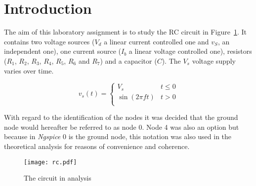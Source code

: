 \section{Introduction}
\label{sec:introduction}


The aim of this laboratory assignment is to study the RC circuit in Figure~\ref{fig:rc}. It contains two voltage sources ($V_d$ a linear current controlled one and $v_S$, an independent one), one current source ($I_b$ a linear voltage controlled one), resistors ($R_1$, $R_2$, $R_3$, $R_4$, $R_5$, $R_6$ and $R_7$) and a capacitor ($C$).
The $V_s$ voltage supply varies over time.

\[ 
v_s (t)= \left\{
\begin{array}{ll}
      V_s & t \leq 0 \\
      \sin(2 \pi f t) & t>0\\
\end{array} 
\right. 
\]

With regard to the identification of the nodes it was decided that the ground node would hereafter be referred to as node 0. Node 4 was also an option but because in \textit{Ngspice} 0 is the ground node, this notation was also used in the theoretical analysis for reasons of convenience and coherence.


\begin{figure}[h] \centering
\texttt{[image: rc.pdf]}
\caption{The circuit in analysis}
\label{fig:rc}
\end{figure}




